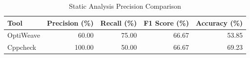 \begin{table}[h]
\centering
\caption{Static Analysis Precision Comparison}
\label{tab:rq2-precision}
\begin{tabular}{lrrrr}
\toprule
\textbf{Tool} & \textbf{Precision (\%)} & \textbf{Recall (\%)} & \textbf{F1 Score (\%)} & \textbf{Accuracy (\%)} \\
\midrule
OptiWeave & 60.00 & 75.00 & 66.67 & 53.85 \\
Cppcheck & 100.00 & 50.00 & 66.67 & 69.23 \\
\bottomrule
\end{tabular}
\end{table}
